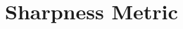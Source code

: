 \graphicspath{{figure_sharpness_metric/}}%

\section{Sharpness Metric}



%                



\newpage